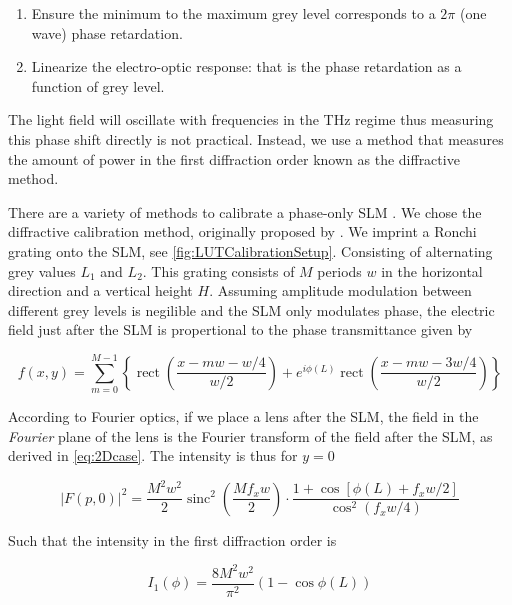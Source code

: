 \begin{enumerate}
    \itemsep=0pt
    
    \item Ensure the minimum to the maximum grey level corresponds to a $2\pi$ (one wave) phase retardation.
    
    \item Linearize the electro-optic response: that is the phase retardation as a function of grey level. 
\end{enumerate}


The light field will oscillate with frequencies in the THz regime thus measuring this phase shift directly is not practical. 
Instead, we use a method that measures the amount of power in the first diffraction order known as the diffractive method. 

There are a variety of methods to calibrate a phase-only \ac{SLM} \cite{Li2019}. 
We chose the diffractive calibration method, originally proposed by \cite{Zhang1994}.
We imprint a Ronchi grating onto the SLM, see \cref{fig:LUTCalibrationSetup}.
Consisting of alternating grey values $L_1$ and $L_2$.
This grating consists of $M$ periods $w$ in the horizontal direction and a vertical height $H$. 
Assuming amplitude modulation between different grey levels is negilible and the SLM only modulates phase, the electric field just after the SLM is propertional to the phase transmittance given by

\begin{equation}\label{eq:FieldAfterSLM}
    f(x,y) = \sum_{m=0}^{M-1} \left\{
    \operatorname{rect}\left(\frac{x-m w - w/4}{w/2}\right) + e^{i \phi(L)} \operatorname{rect}\left(\frac{x - m w - 3 w/4}{w/2}\right)
    \right\}
\end{equation}

According to Fourier optics, if we place a lens after the SLM, the field in the \textit{Fourier} plane of the lens is the Fourier transform of the field after the SLM, as derived in \cref{eq:2Dcase}.
The intensity is thus for $y=0$

\begin{equation}\label{eq:FourierIntensity}
    |F(p,0)|^2=
    \frac{M^2 w^2}{2}\operatorname{sinc}^2\left(\frac{M f_x w}{2}\right) \cdot
    \frac{1 + \cos{\left[\phi(L)+f_x w/2\right]}}{\cos^2(f_x w/4)}
\end{equation}

Such that the intensity in the first diffraction order is

\begin{equation}\label{eq:IntensityFirstOrder}
    I_1(\phi) =
    \frac{8M^2w^2}{\pi^2} \left( 
    1-\cos{\phi(L)}
    \right)
\end{equation}

